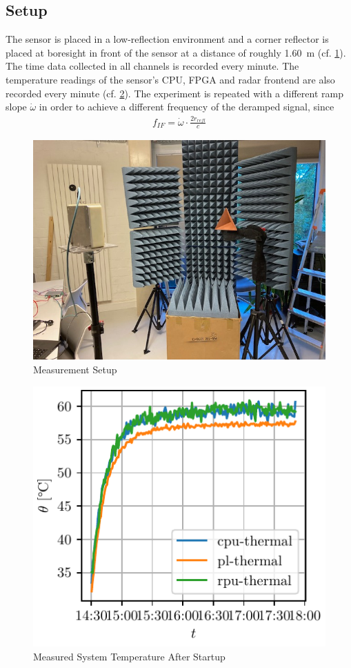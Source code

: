 \subsection{Setup}
The sensor is placed in a low-reflection environment and a corner reflector is placed at boresight in front of the sensor at a distance of roughly \SI{1.60}{\m} (cf. \ref{fig:photo_setup}).
The time data collected in all channels is recorded every minute.
The temperature readings of the sensor's CPU, FPGA and radar frontend are also recorded every minute (cf. \ref{fig:act_temp}).
The experiment is repeated with a different ramp slope $\dot \omega$ in order to achieve a different frequency of the deramped signal, since
\begin{align}
    f_{IF} = \dot \omega \cdot \frac{2 r_{refl}}{c}
\end{align}
\begin{figure}
    \centering
    \includegraphics[height=0.25\textheight]{../figures/aufbau1.jpg}
    \caption{Measurement Setup}
    \label{fig:photo_setup}
\end{figure}
\begin{figure}
    \centering
    \includegraphics[height=0.25\textheight]{../figures/actual_temperature.pdf}
    \caption{Measured System Temperature After Startup}
    \label{fig:act_temp}
\end{figure}

